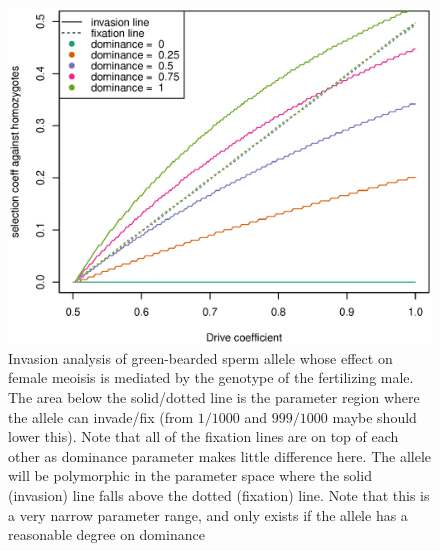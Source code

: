 \documentclass[12pt,letterpaper]{article}
\newcommand{\gc}[1]{{ \color{red} #1}}
\begin{document}
\begin{figure}
\includegraphics[width = 0.8 \textwidth]{Figures/effect_of_dominance_on_invasion_space_one_graph.eps} 
\caption{Invasion analysis of green-bearded sperm allele whose effect
 on female meoisis is mediated by the genotype of the fertilizing
 male. The area below the solid/dotted line is the parameter region
 where the allele can invade/fix (from $1/1000$ and $999/1000$
 \gc{maybe should lower this}). Note
 that all of the fixation lines are on top of each other as dominance
 parameter makes little difference here. The allele will be
 polymorphic in the parameter space where the solid (invasion) line
 falls above the dotted (fixation) line. Note that this is a very
 narrow parameter range, and only exists if the allele has a
 reasonable degree on dominance}  \label{Effect_of_dominance}
\end{figure}
\end{document}
